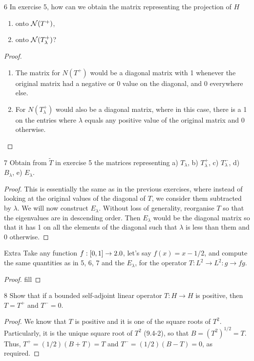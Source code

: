 \begin{exercise}{6}
In exercise 5, how can we obtain the matrix representing the projection of $H$
\begin{enumerate}
    \item onto $\mathcal{N}(T^+)$,
    \item onto $\mathcal{N}(T^+_\lambda)$?
\end{enumerate}
\end{exercise}
\begin{proof}
\begin{enumerate}
    \item The matrix for $N(T^+)$ would be a diagonal matrix with 1 whenever the original matrix had a negative or 0 value on the diagonal, and 0 everywhere else.
    \item For $N(T_\lambda^+)$ would also be a diagonal matrix, where in this case, there is a 1 on the entries where $\lambda$ equals any positive value of the original matrix and 0 otherwise.
\end{enumerate}
\end{proof} 

\begin{exercise}{7}
Obtain from $\tilde{T}$ in exercise 5 the matrices representing
a) $T_\lambda$,
b) $T^+_\lambda$,
c) $T^-_\lambda$,
d) $B_\lambda$, 
e) $E_\lambda$.
\end{exercise}
\begin{proof}
This is essentially the same as in the previous exercises, where instead of looking at the original values of the diagonal of $T$, we consider them subtracted by $\lambda$.
We will now construct $E_\lambda$.
Without loss of generality, reorganise $T$ so that the eigenvalues are in descending order.
Then $E_\lambda$ would be the diagonal matrix so that it has 1 on all the elements of the diagonal such that $\lambda$ is less than them and 0 otherwise.
\end{proof} 

\begin{exercise}{Extra}
Take any function $f: [0,1] \to 2.0$, let's say $f(x) = x - 1/2$, and compute the same quantities as in 5, 6, 7 and the $E_\lambda$, for the operator $T:L^2 \to L^2: g \to fg$.
\end{exercise}
\begin{proof}
fill
\end{proof} 

\begin{exercise}{8}
Show that if a bounded self-adjoint linear operator $T: H \to H$ is positive, then $T = T^+$ and $T^- = 0$.
\end{exercise}
\begin{proof}
We know that $T$ is positive and it is one of the square roots of $T^2$.
Particularly, it is the unique square root of $T^2$ (9.4-2), so that $B = (T^2)^{1/2} = T$.
Thus, $T^+ = (1/2)(B + T) = T$ and $T^- = (1/2)(B - T) = 0$, as required.
\end{proof} 

